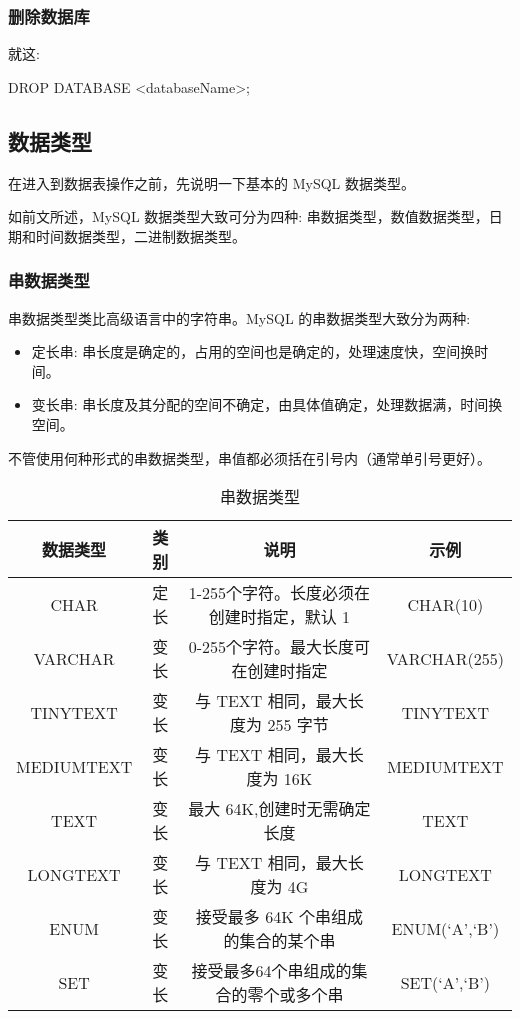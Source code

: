 \subsubsection{删除数据库}

就这:

\begin{sql}
DROP DATABASE <databaseName>;
\end{sql}

\subsection{数据类型}

在进入到数据表操作之前，先说明一下基本的 MySQL 数据类型。

如前文所述，MySQL 数据类型大致可分为四种: 串数据类型，数值数据类型，日期和时间数据类型，二进制数据类型。

\subsubsection{串数据类型}

串数据类型类比高级语言中的字符串。MySQL 的串数据类型大致分为两种:
\begin{itemize}
    \item 定长串: 串长度是确定的，占用的空间也是确定的，处理速度快，空间换时间。
    \item 变长串: 串长度及其分配的空间不确定，由具体值确定，处理数据满，时间换空间。
\end{itemize}

不管使用何种形式的串数据类型，串值都必须括在引号内（通常单引号更好）。

\begin{table}[H]
    \small
    \centering
    \caption{串数据类型}
    \label{table:串数据类型}
    \setlength{\tabcolsep}{4mm}
    \begin{tabular}{c|ccc}
        \toprule
        \textbf{数据类型} & \textbf{类别} & \textbf{说明} & \textbf{示例} \\
        \midrule
        CHAR & 定长 & 1-255个字符。长度必须在创建时指定，默认 1 & CHAR(10) \\
        VARCHAR & 变长 & 0-255个字符。最大长度可在创建时指定 & VARCHAR(255) \\
        \midrule
        TINYTEXT & 变长 & 与 TEXT 相同，最大长度为 255 字节 & TINYTEXT \\
        MEDIUMTEXT & 变长 & 与 TEXT 相同，最大长度为 16K & MEDIUMTEXT \\
        TEXT & 变长 & 最大 64K,创建时无需确定长度 & TEXT \\
        LONGTEXT & 变长 &  与 TEXT 相同，最大长度为 4G & LONGTEXT \\
        \midrule
        ENUM & 变长 & 接受最多 64K 个串组成的集合的某个串 & ENUM(`A',`B') \\
        SET & 变长 & 接受最多64个串组成的集合的零个或多个串 & SET(`A',`B') \\
        \bottomrule
    \end{tabular}
\end{table}

